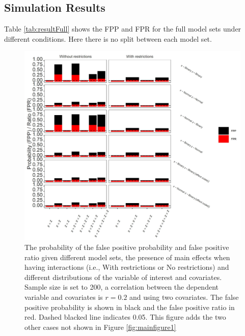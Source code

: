 

\subsection{Simulation Results}

Table \ref{tab:resultFull} shows the FPP and FPR for the full model sets under different conditions. Here there is no split between each model set.



\begin{figure}[hbt!]
\includegraphics[scale=0.95]{R/Analysis/Result/Figures/Figure1ASI.jpeg}
\centering
\caption{The probability of the false positive probability and false positive ratio given different model sets, the presence of main effects when having interactions (i.e., With restrictions or No restrictions) and different distributions of the variable of interest and covariates. Sample size is set to 200, a correlation between the dependent variable and covariates is $\textit{r}=0.2$ and using two covariates. The false positive probability is shown in black and the false positive ratio in red. Dashed blacked line indicates 0.05. This figure adds the two other cases not shown in Figure \ref{fig:mainfigure1}}
\label{fig:appfigure1}
\end{figure}

\begin{landscape}

\end{landscape}

